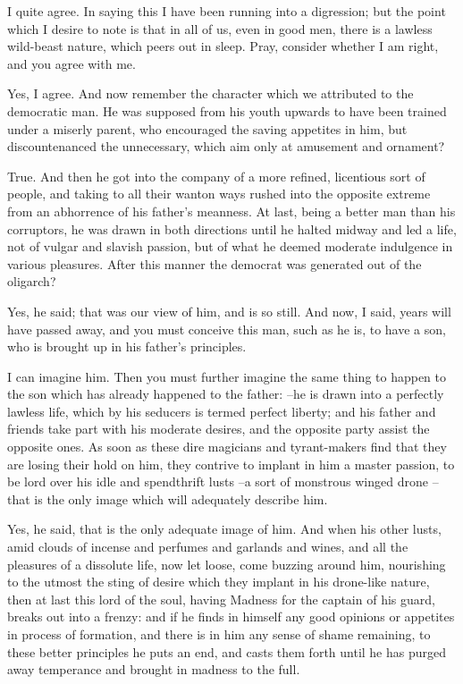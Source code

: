 I quite agree.
In saying this I have been running into a digression; but the point which I desire to note is that in all of us, even in good men, there is a lawless wild-beast nature, which peers out in sleep. Pray, consider whether I am right, and you agree with me.

Yes, I agree.
And now remember the character which we attributed to the democratic man. He was supposed from his youth upwards to have been trained under a miserly parent, who encouraged the saving appetites in him, but discountenanced the unnecessary, which aim only at amusement and ornament?

True.
And then he got into the company of a more refined, licentious sort of people, and taking to all their wanton ways rushed into the opposite extreme from an abhorrence of his father's meanness. At last, being a better man than his corruptors, he was drawn in both directions until he halted midway and led a life, not of vulgar and slavish passion, but of what he deemed moderate indulgence in various pleasures. After this manner the democrat was generated out of the oligarch?

Yes, he said; that was our view of him, and is so still.
And now, I said, years will have passed away, and you must conceive this man, such as he is, to have a son, who is brought up in his father's principles.

I can imagine him.
Then you must further imagine the same thing to happen to the son which has already happened to the father: --he is drawn into a perfectly lawless life, which by his seducers is termed perfect liberty; and his father and friends take part with his moderate desires, and the opposite party assist the opposite ones. As soon as these dire magicians and tyrant-makers find that they are losing their hold on him, they contrive to implant in him a master passion, to be lord over his idle and spendthrift lusts --a sort of monstrous winged drone --that is the only image which will adequately describe him.

Yes, he said, that is the only adequate image of him.
And when his other lusts, amid clouds of incense and perfumes and garlands and wines, and all the pleasures of a dissolute life, now let loose, come buzzing around him, nourishing to the utmost the sting of desire which they implant in his drone-like nature, then at last this lord of the soul, having Madness for the captain of his guard, breaks out into a frenzy: and if he finds in himself any good opinions or appetites in process of formation, and there is in him any sense of shame remaining, to these better principles he puts an end, and casts them forth until he has purged away temperance and brought in madness to the full.


